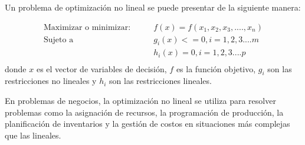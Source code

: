 \documentclass{beamer}
\begin{document}
\begin{frame}
    Un problema de optimización no lineal se puede presentar de la siguiente manera:

    \begin{align*}
        \text{Maximizar o minimizar:} \qquad & f(x) = f(x_1,x_2,x_3,....,x_n)\\
        \text{Sujeto a} \qquad & g_i(x) <= 0, i=1,2,3....m \\
        & h_i(x) = 0, i=1,2,3....p\\
    \end{align*}
    donde $x$ es el vector de variables de decisión, $f$ es la función objetivo, $g_i$ son las restricciones no lineales y $h_i$ son las restricciones lineales.

\end{frame}

\begin{frame}
    En problemas de negocios, la optimización no lineal se utiliza para resolver problemas como la asignación de recursos, la programación de producción, la planificación de inventarios y la gestión de costos en situaciones más complejas que las lineales.
\end{frame}
\end{document}
